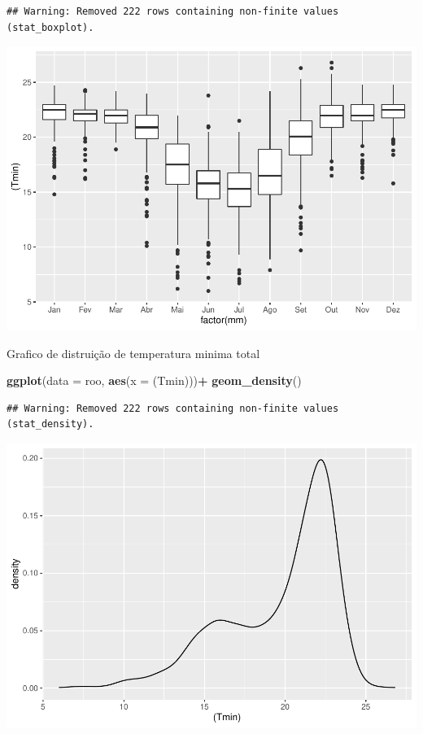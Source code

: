 \documentclass[]{book}
\newenvironment{Shaded}{\begin{snugshade}}{\end{snugshade}}
\newcommand{\DataTypeTok}[1]{\textcolor[rgb]{0.13,0.29,0.53}{#1}}
\newcommand{\KeywordTok}[1]{\textcolor[rgb]{0.13,0.29,0.53}{\textbf{#1}}}
\newcommand{\NormalTok}[1]{#1}
\newcommand{\OperatorTok}[1]{\textcolor[rgb]{0.81,0.36,0.00}{\textbf{#1}}}
\newcommand{\StringTok}[1]{\textcolor[rgb]{0.31,0.60,0.02}{#1}}
\begin{document}
\begin{verbatim}
## Warning: Removed 222 rows containing non-finite values (stat_boxplot).
\end{verbatim}

\includegraphics{TudodoR_files/figure-latex/unnamed-chunk-241-1.pdf}

Grafico de distruição de temperatura minima total

\begin{Shaded}
\begin{Highlighting}[]
\KeywordTok{ggplot}\NormalTok{(}\DataTypeTok{data =}\NormalTok{ roo, }\KeywordTok{aes}\NormalTok{(}\DataTypeTok{x =}\NormalTok{ (Tmin)))}\OperatorTok{+}
\StringTok{  }\KeywordTok{geom_density}\NormalTok{()}
\end{Highlighting}
\end{Shaded}

\begin{verbatim}
## Warning: Removed 222 rows containing non-finite values (stat_density).
\end{verbatim}

\includegraphics{TudodoR_files/figure-latex/unnamed-chunk-242-1.pdf}
\end{document}
